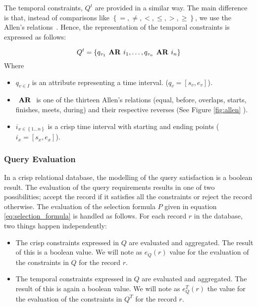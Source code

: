 The temporal constraints, $Q^t$ are provided in a similar way. The main difference is that, instead of comparisons like $\left \lbrace =, \neq, <, \leq, >, \geq \right \rbrace$, we use the Allen's relations~\cite{Allen1983}. Hence, the representation of the temporal constraints is expressed as follows:

\begin{equation}
\label{eq:temporal-constratins}
Q^{t} = \left \lbrace q_{v_1}  \mbox{\textbf{ AR }} i_1, \ldots, q_{v_n}  \mbox{\textbf{ AR }} i_n \right \rbrace
\end{equation}
Where
\begin{itemize}
\item $q_{v \in I}$ is an attribute representing a time interval. ($q_v =  \left[s_v, e_v \right]$).
\item $\mbox{\textbf{ AR }}$ is one of the thirteen Allen's relations (equal, before, overlaps, starts, finishes, meets, during) and their respective reverses (See Figure \ref{fig:allen} ).
\item $i_{x \in \left \lbrace 1 \ldots n\right \rbrace}$ is a crisp time interval with starting and ending points ($i_x = \left[s_x, e_x \right]$).

\end{itemize}

\subsubsection{\label{crisp-query-eval}Query Evaluation}
In a crisp relational database, the modelling of the query satisfaction is a boolean result. The evaluation of the query requirements results in one of two possibilities; accept the record if it satisfies all the constraints or reject the record otherwise. The evaluation of the selection formula $P$ given in equation \eqref{eq:selection_formula} is handled as follows. For each record $r$ in the database, two things happen independently:

\begin{itemize}
 \item The crisp constraints expressed in $Q$ are evaluated and aggregated. The result of this is a boolean value. We will note as $e_Q(r)$ value for the evaluation of the constraints in  $Q$ for the record $r$.
\item The temporal constraints expressed in $Q$ are evaluated and aggregated. The result of this is again a boolean value. We will note as $e_Q^{T}(r)$ the value for the evaluation of the constraints in $Q^T$ for the record $r$.
\end{itemize}


